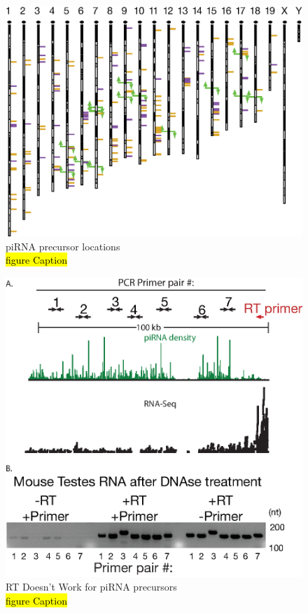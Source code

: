 \begin{figure}[htbp]
	\centering 
	\includegraphics{Figures/Chapter2/PrecursorLocations.eps}
	\caption[piRNA precursor locations]
	{
		piRNA precursor locations\\
		\hl{figure Caption}
	}
	\label{fig:Hiv tx via SeqZip}
\end{figure}




\begin{figure}[htbp]
	\centering 
	\includegraphics{Figures/Chapter2/RTDoesntWork.eps}
	\caption[pRT Doesn't Work for piRNA precursors]
	{
		RT Doesn't Work for piRNA precursors\\
		\hl{figure Caption}
	}
	\label{fig:Hiv tx via SeqZip}
\end{figure}

